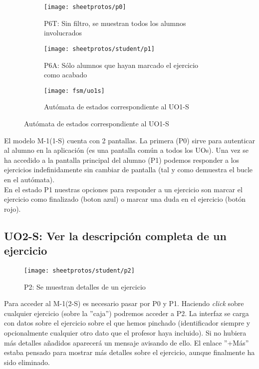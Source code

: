 \begin{figure}[H]
\begin{subfigure}[b]{0.5\textwidth}
	\centering
	\texttt{[image: sheetprotos/p0]}
	\caption{P6T: Sin filtro, se muestran todos los alumnos involucrados}
	\label{fig:analisis-de-requisitos:funcionales:uo1s:p0}
\end{subfigure}
%
\begin{subfigure}[b]{0.5\textwidth}
	\centering
	\texttt{[image: sheetprotos/student/p1]}
	\caption{P6A: Sólo alumnos que hayan marcado el ejercicio como acabado}
	\label{fig:analisis-de-requisitos:funcionales:uo1s:p1}
\end{subfigure}

\begin{subfigure}[b]{\textwidth}
	\centering
	\texttt{[image: fsm/uo1s]}
	\caption{Autómata de estados correspondiente al UO1-S}
	\label{fig:analisis-de-requisitos:funcionales:uo1s:fsm-uo1s}
\end{subfigure}

\label{fig:analisis-de-requisitos:funcionales:uo1s}
\end{figure}

El modelo M-1(1-S) cuenta con 2 pantallas. La primera (P0) sirve para autenticar al alumno en la aplicación (es una pantalla común a todos los UOs). Una vez se ha accedido a la pantalla principal del alumno (P1) podemos responder a los ejercicios indefinidamente sin cambiar de pantalla (tal y como demuestra el bucle en el autómata).\\

En el estado P1 nuestras opciones para responder a un ejercicio son marcar el ejercicio como finalizado (boton azul) o marcar una duda en el ejercicio (botón rojo).\\

\subsection{UO2-S: Ver la descripción completa de un ejercicio}
\label{analisis-de-requisitos:funcionales:uo2s}

\begin{figure}[H]
	\centering
	\texttt{[image: sheetprotos/student/p2]}
	\caption{P2: Se muestran detalles de un ejercicio}
	\label{fig:analisis-de-requisitos:funcionales:uo2s:p2}
\end{figure}

Para acceder al M-1(2-S) es necesario pasar por P0 y P1. Haciendo \textit{click} sobre cualquier ejercicio (sobre la ''caja'') podremos acceder a P2. La interfaz se carga con datos sobre el ejercicio sobre el que hemos pinchado (identificador siempre y opcionalmente cualquier otro dato que el profesor haya incluido). Si no hubiera más detalles añadidos aparecerá un mensaje avisando de ello. El enlace ''+Más'' estaba pensado para mostrar más detalles sobre el ejercicio, aunque finalmente ha sido eliminado.\\

